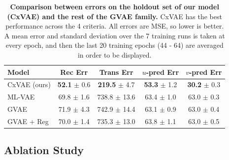 \documentclass[nohyperref]{article}
\theoremstyle{plain}
\theoremstyle{definition}
\theoremstyle{remark}
\begin{document}
\begin{table}[t]
    \caption{\textbf{Comparison between errors on the holdout set of our model (CxVAE) and the rest of the GVAE family.} CxVAE has the best performance across the 4 criteria. All errors are MSE, so lower is better. A mean error and standard deviation over the 7 training runs is taken at every epoch, and then the last 20 training epochs (44 - 64) are averaged in order to be displayed.}
    \label{results}
    \vskip 0.15in
    \begin{center}
    \begin{small}
    \begin{sc}
    \begin{tabular}{lcccc}
    \toprule
    Model & Rec Err & Trans Err & $u$-pred Err & $v$-pred Err \\
    \midrule
    CxVAE (ours) & \textbf{52.1} $\pm$ 0.6 & \textbf{219.5} $\pm$ 4.7 & \textbf{53.3} $\pm$ 1.2 & \textbf{30.2} $\pm$ 0.3 \\
    ML-VAE \citep{Bouchacourt2018MultiLevelVA} & 69.8 $\pm$ 1.6 & 738.8 $\pm$ 13.6  & 63.4 $\pm$ 1.0 & 63.0 $\pm$ 0.3 \\
    GVAE \citep{Hosoya2019GroupbasedLO} & 71.9 $\pm$ 4.3 & 742.9 $\pm$ 14.4 & 63.1 $\pm$ 0.9 & 63.0 $\pm$ 0.4 \\
    GVAE + Reg \citep{Nmeth2020AdversarialDW} & 70.0 $\pm$ 1.4 & 735.3 $\pm$ 13.0 & 63.8 $\pm$ 1.1 & 63.0 $\pm$ 0.5 \\
    \bottomrule
    \end{tabular}
    \end{sc}
    \end{small}
    \end{center}
    \vskip -0.1in
\end{table}

\subsection{Ablation Study}
\end{document}
